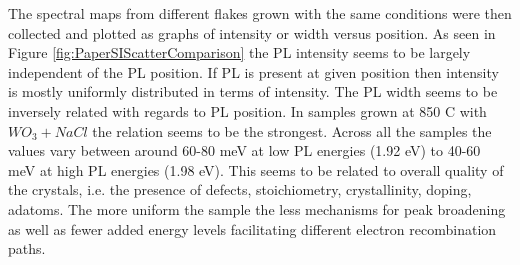 \documentclass[12pt]{article}
\begin{document}
The spectral maps from different flakes grown with the same conditions were then collected and plotted as graphs of intensity or width versus position. As seen in Figure \ref{fig:PaperSIScatterComparison} the PL intensity seems to be largely independent of the PL position. If PL is present at given position then intensity is mostly uniformly distributed in terms of intensity. The PL width seems to be inversely related with regards to PL position. In samples grown at 850 {\degree}C with $WO_3 + NaCl$ the relation seems to be the strongest. Across all the samples the values vary between around 60-80 meV at low PL energies (1.92 eV) to 40-60 meV at high PL energies (1.98 eV). This seems to be related to overall quality of the crystals, i.e. the presence of defects, stoichiometry, crystallinity, doping, adatoms. The more uniform the sample the less mechanisms for peak broadening as well as fewer added energy levels facilitating different electron recombination paths.
\end{document}
